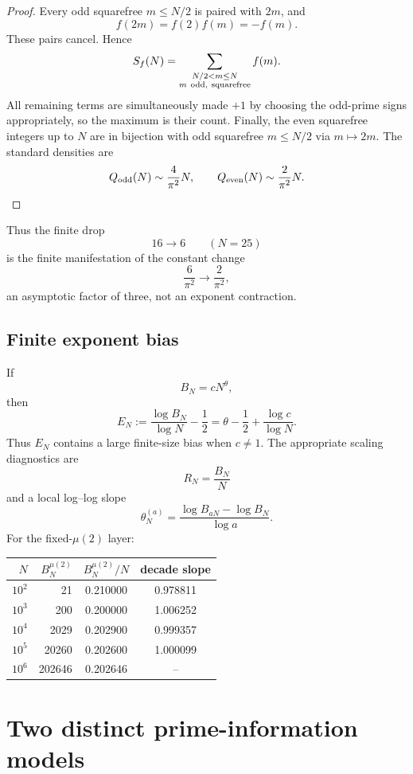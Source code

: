 \documentclass[11pt]{article}
\begin{document}
\begin{proof}
Every odd squarefree $m\le N/2$ is paired with $2m$, and
\[
 f(2m)=f(2)f(m)=-f(m).
\]
These pairs cancel.  Hence
\[
 S_f(N)=
 \sum_{\substack{N/2<m\le N\\m\ {\rm odd,\ squarefree}}}f(m).
\]
All remaining terms are simultaneously made $+1$ by choosing the odd-prime signs appropriately, so the maximum is their count.  Finally, the even squarefree integers up to $N$ are in bijection with odd squarefree $m\le N/2$ via $m\mapsto2m$.  The standard densities are
\[
 Q_{\rm odd}(N)\sim\frac4{\pi^2}N,\qquad
 Q_{\rm even}(N)\sim\frac2{\pi^2}N.
\]
\end{proof}

Thus the finite drop
\[
 16\longrightarrow6\qquad(N=25)
\]
is the finite manifestation of the constant change
\[
 \frac6{\pi^2}\longrightarrow\frac2{\pi^2},
\]
an asymptotic factor of three, not an exponent contraction.

\subsection{Finite exponent bias}

If
\[
 B_N=cN^\theta,
\]
then
\[
 \boxed{
 E_N:=\frac{\log B_N}{\log N}-\frac12
 =\theta-\frac12+\frac{\log c}{\log N}.
 }
\]
Thus $E_N$ contains a large finite-size bias when $c\ne1$.  The appropriate scaling diagnostics are
\[
 R_N=\frac{B_N}{N}
\]
and a local log--log slope
\[
 \boxed{
 \theta_N^{(a)}
 =\frac{\log B_{aN}-\log B_N}{\log a}.
 }
\]
For the fixed-$\mu(2)$ layer:
\begin{center}
\begin{tabular}{r r c c}
\toprule
$N$ & $B_N^{\mu(2)}$ & $B_N^{\mu(2)}/N$ & decade slope\\
\midrule
$10^2$&21&0.210000&0.978811\\
$10^3$&200&0.200000&1.006252\\
$10^4$&2029&0.202900&0.999357\\
$10^5$&20260&0.202600&1.000099\\
$10^6$&202646&0.202646&--\\
\bottomrule
\end{tabular}
\end{center}

\section{Two distinct prime-information models}
\end{document}

